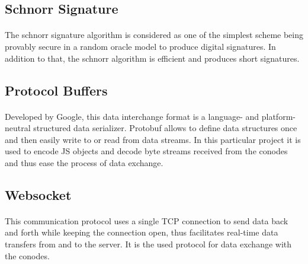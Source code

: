 \subsection[Schnorr Signature]{Schnorr Signature\raisebox{.3\baselineskip}{\normalsize\footnotemark}}

\paragraph{}
The schnorr signature algorithm is considered as one of the simplest scheme being provably secure in a random oracle model to produce digital signatures. In addition to that, the schnorr algorithm is efficient and produces short signatures.

\subsection[Protocol Buffers]{Protocol Buffers\raisebox{.3\baselineskip}{\normalsize\footnotemark}}

\paragraph{}
Developed by Google, this data interchange format is a language- and platform-neutral structured data serializer. Protobuf allows to define data structures once and then easily write to or read from data streams. In this particular project it is used to encode JS objects and decode byte streams received from the conodes and thus ease the process of data exchange.

\subsection[Websocket]{Websocket\raisebox{.3\baselineskip}{\normalsize\footnotemark}}

\paragraph{}
This communication protocol uses a single TCP connection to send data back and forth while keeping the connection open, thus facilitates real-time data transfers from and to the server. It is the used protocol for data exchange with the conodes.


